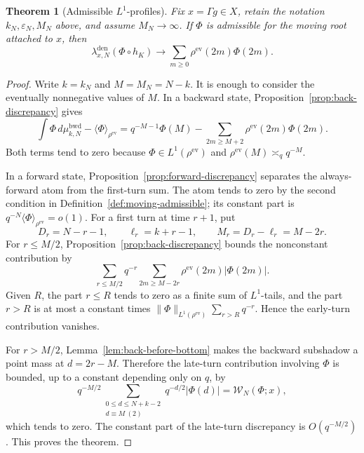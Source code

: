 \documentclass[11pt]{amsart}
\theoremstyle{definition}
\theoremstyle{plain}
\newtheorem{theorem}[definition]{Theorem}
\newcommand{\bwd}{\mathrm{bwd}}
\newcommand{\ev}{\mathrm{ev}}
\newcommand{\ang}{\langle}
\newcommand{\rang}{\rangle}
\begin{document}
\begin{theorem}[Admissible \(L^1\)-profiles]
\label{thm:dense-L1}
Fix \(x=\Gamma g\in X\), retain the notation \(k_N,\varepsilon_N,M_N\) above,
and assume \(M_N\to\infty\).  If \(\Phi\) is admissible for the moving root
attached to \(x\), then
\[
\lambda_{x,N}^{\mathrm{den}}(\Phi\circ h_K)
 \longrightarrow
 \sum_{m\ge0}\rho^{\ev}(2m)\Phi(2m).
\]
\end{theorem}

\begin{proof}
Write \(k=k_N\) and \(M=M_N=N-k\).  It is enough to consider the eventually
nonnegative values of \(M\).  In a backward state,
Proposition~\ref{prop:back-discrepancy} gives
\[
\int \Phi\,d\mu^{\bwd}_{k,N}-\ang\Phi\rang_{\rho^{\ev}}
 =q^{-M-1}\Phi(M)
  -\sum_{2m\ge M+2}\rho^{\ev}(2m)\Phi(2m).
\]
Both terms tend to zero because \(\Phi\in L^1(\rho^{\ev})\) and
\(\rho^{\ev}(M)\asymp_q q^{-M}\).

In a forward state, Proposition~\ref{prop:forward-discrepancy} separates the
always-forward atom from the first-turn sum.  The atom tends to zero by the
second condition in Definition~\ref{def:moving-admissible}; its constant part
is \(q^{-N}\ang\Phi\rang_{\rho^{\ev}}=o(1)\).  For a first turn
at time \(r+1\), put
\[
D_r=N-r-1,\qquad \ell_r=k+r-1,\qquad
M_r=D_r-\ell_r=M-2r.
\]
For \(r\le M/2\), Proposition~\ref{prop:back-discrepancy} bounds the
nonconstant contribution by
\[
\sum_{r\le M/2}q^{-r}
 \sum_{2m\ge M-2r}\rho^{\ev}(2m)|\Phi(2m)|.
\]
Given \(R\), the part \(r\le R\) tends to zero as a finite sum of
\(L^1\)-tails, and the part \(r>R\) is at most a constant times
\(\|\Phi\|_{L^1(\rho^{\ev})}\sum_{r>R}q^{-r}\).  Hence the early-turn contribution
vanishes.

For \(r>M/2\), Lemma~\ref{lem:back-before-bottom} makes the backward subshadow
a point mass at \(d=2r-M\).  Therefore the late-turn contribution involving
\(\Phi\) is bounded, up to a constant depending only on \(q\), by
\[
q^{-M/2}
 \sum_{\substack{0\le d\le N+k-2\\d\equiv M\ (2)}}
 q^{-d/2}|\Phi(d)|
 =\mathcal W_N(\Phi;x),
\]
which tends to zero.  The constant part of the late-turn discrepancy is
\(O(q^{-M/2})\).  This proves the theorem.
\end{proof}
\end{document}
